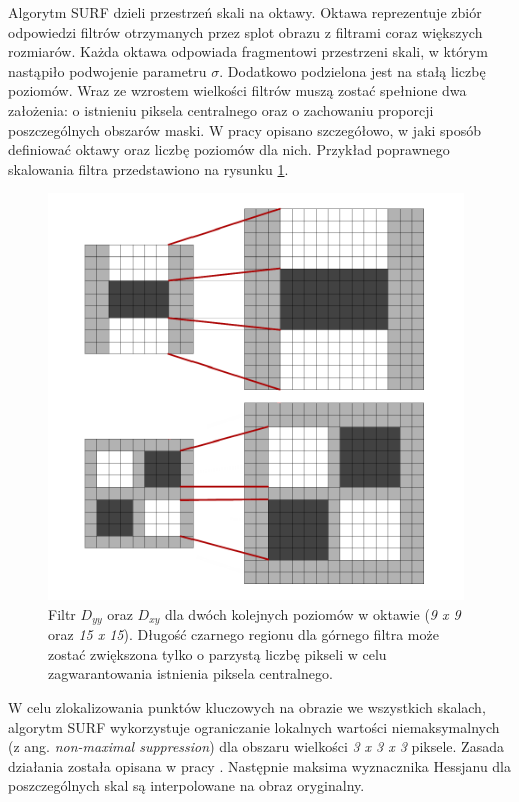  Algorytm SURF dzieli przestrzeń skali na oktawy. Oktawa reprezentuje zbiór odpowiedzi filtrów otrzymanych przez splot obrazu z filtrami coraz większych rozmiarów. Każda oktawa odpowiada fragmentowi przestrzeni skali, w którym nastąpiło podwojenie parametru $\sigma$. Dodatkowo podzielona jest na stałą liczbę poziomów. Wraz ze wzrostem wielkości filtrów muszą zostać spełnione dwa założenia: o istnieniu piksela centralnego oraz o zachowaniu proporcji poszczególnych obszarów maski. W pracy \cite{Surf} opisano szczegółowo, w jaki sposób definiować oktawy oraz liczbę poziomów dla nich. Przykład poprawnego skalowania filtra przedstawiono na rysunku \ref{im: FiltersScale}. 
 
 \begin{figure}[h]
 	\includegraphics[width=11cm]{FiltersScale}
 	\centering
 	\caption{Filtr $D_{yy}$ oraz $D_{xy}$ dla dwóch kolejnych poziomów w oktawie (\textit{9 x 9} oraz \textit{15 x 15}). Długość czarnego regionu dla górnego filtra może zostać zwiększona tylko o parzystą liczbę pikseli w celu zagwarantowania istnienia piksela centralnego.}
 	\label{im: FiltersScale}
 \end{figure}
 
W celu zlokalizowania punktów kluczowych na obrazie we wszystkich skalach, algorytm SURF wykorzystuje ograniczanie lokalnych wartości niemaksymalnych (z ang. \textit{non-maximal suppression}) dla obszaru wielkości \textit{3 x 3 x 3} piksele. Zasada działania została opisana w pracy \cite{Surf}. Następnie maksima wyznacznika Hessjanu dla poszczególnych skal są interpolowane na obraz oryginalny.

